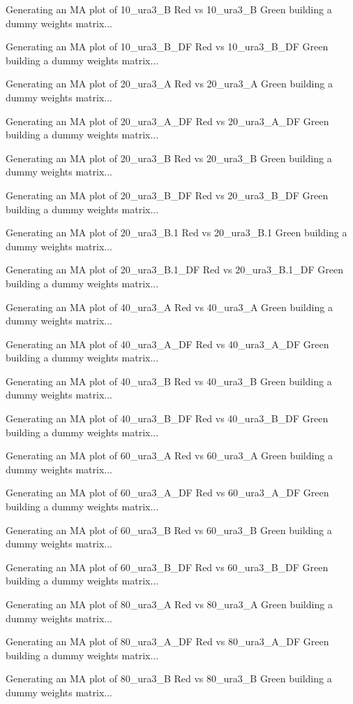 \documentclass[titlepage]{article}
\begin{document}
\begin{Schunk}
\begin{Soutput}
Generating an MA plot of  10_ura3_B Red vs 10_ura3_B Green 
building a dummy weights matrix... 

Generating an MA plot of  10_ura3_B_DF Red vs 10_ura3_B_DF Green 
building a dummy weights matrix... 

Generating an MA plot of  20_ura3_A Red vs 20_ura3_A Green 
building a dummy weights matrix... 

Generating an MA plot of  20_ura3_A_DF Red vs 20_ura3_A_DF Green 
building a dummy weights matrix... 

Generating an MA plot of  20_ura3_B Red vs 20_ura3_B Green 
building a dummy weights matrix... 

Generating an MA plot of  20_ura3_B_DF Red vs 20_ura3_B_DF Green 
building a dummy weights matrix... 

Generating an MA plot of  20_ura3_B.1 Red vs 20_ura3_B.1 Green 
building a dummy weights matrix... 

Generating an MA plot of  20_ura3_B.1_DF Red vs 20_ura3_B.1_DF Green 
building a dummy weights matrix... 

Generating an MA plot of  40_ura3_A Red vs 40_ura3_A Green 
building a dummy weights matrix... 

Generating an MA plot of  40_ura3_A_DF Red vs 40_ura3_A_DF Green 
building a dummy weights matrix... 

Generating an MA plot of  40_ura3_B Red vs 40_ura3_B Green 
building a dummy weights matrix... 

Generating an MA plot of  40_ura3_B_DF Red vs 40_ura3_B_DF Green 
building a dummy weights matrix... 

Generating an MA plot of  60_ura3_A Red vs 60_ura3_A Green 
building a dummy weights matrix... 

Generating an MA plot of  60_ura3_A_DF Red vs 60_ura3_A_DF Green 
building a dummy weights matrix... 

Generating an MA plot of  60_ura3_B Red vs 60_ura3_B Green 
building a dummy weights matrix... 

Generating an MA plot of  60_ura3_B_DF Red vs 60_ura3_B_DF Green 
building a dummy weights matrix... 

Generating an MA plot of  80_ura3_A Red vs 80_ura3_A Green 
building a dummy weights matrix... 

Generating an MA plot of  80_ura3_A_DF Red vs 80_ura3_A_DF Green 
building a dummy weights matrix... 

Generating an MA plot of  80_ura3_B Red vs 80_ura3_B Green 
building a dummy weights matrix... 


\end{Soutput}
\end{Schunk}
\end{document}
